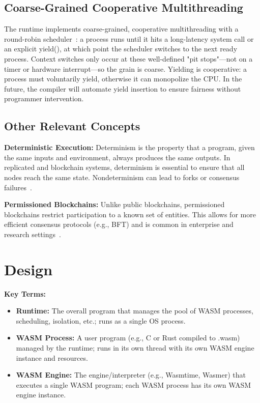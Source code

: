 \documentclass[10pt,a4paper,twocolumn]{IEEEtran}
\begin{document}
\subsection{Coarse-Grained Cooperative Multithreading}
The runtime implements coarse-grained, cooperative multithreading with a round-robin scheduler~\cite{tannenbaum_os}: a process runs until it hits a long-latency system call or an explicit yield(), at which point the scheduler switches to the next ready process. Context switches only occur at these well-defined "pit stops"—not on a timer or hardware interrupt—so the grain is coarse. Yielding is cooperative: a process must voluntarily yield, otherwise it can monopolize the CPU. In the future, the compiler will automate yield insertion to ensure fairness without programmer intervention.

\subsection{Other Relevant Concepts}
\textbf{Deterministic Execution:} Determinism is the property that a program, given the same inputs and environment, always produces the same outputs. In replicated and blockchain systems, determinism is essential to ensure that all nodes reach the same state. Nondeterminism can lead to forks or consensus failures~\cite{batch_schedule_execute}.

\textbf{Permissioned Blockchains:} Unlike public blockchains, permissioned blockchains restrict participation to a known set of entities. This allows for more efficient consensus protocols (e.g., BFT) and is common in enterprise and research settings~\cite{blockchain_tutorial,bonomi_smr}.

\section{Design}\label{sec:design}

\textbf{Key Terms:}
\begin{itemize}
    \item \textbf{Runtime:} The overall program that manages the pool of WASM processes, scheduling, isolation, etc.; runs as a single OS process.
    \item \textbf{WASM Process:} A user program (e.g., C or Rust compiled to .wasm) managed by the runtime; runs in its own thread with its own WASM engine instance and resources.
    \item \textbf{WASM Engine:} The engine/interpreter (e.g., Wasmtime, Wasmer) that executes a single WASM program; each WASM process has its own WASM engine instance.
\end{itemize}
\end{document}
